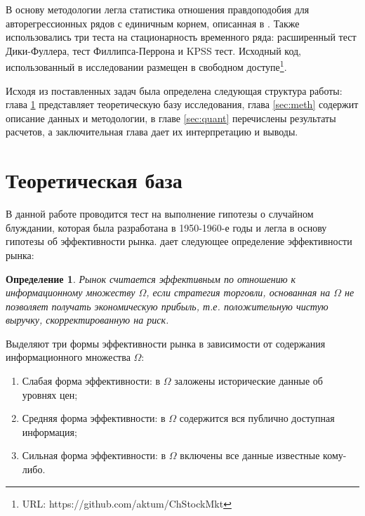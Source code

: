 \documentclass[a4paper,12pt]{article}
\newtheorem{definition}{Определение}
\begin{document}
В основу методологии легла статистика отношения правдоподобия для авторегрессионных рядов с единичным корнем, описанная в \cite{Dickey1981}. Также использовались три теста на стационарность временного ряда: расширенный тест Дики-Фуллера, тест Филлипса-Перрона и KPSS тест. Исходный код, использованный в исследовании размещен в свободном доступе{\footnote{URL: https://github.com/aktum/ChStockMkt}}.

Исходя из поставленных задач была определена следующая структура работы: глава \ref{sec:litrev} представляет теоретическую базу исследования, глава \ref{sec:meth} содержит описание данных и методологии, в главе \ref{sec:quant} перечислены результаты расчетов, а заключительная глава дает их интерпретацию и выводы.
\newpage
\section{Теоретическая база}\label{sec:litrev}

В данной работе проводится тест на выполнение гипотезы о случайном блуждании, которая была разработана в 1950-1960-е годы и легла в основу гипотезы об эффективности рынка. \cite{Jensen1978} дает следующее определение эффективности рынка:

\begin{definition}
  Рынок считается эффективным по отношению к информационному множеству $\Omega$, если стратегия торговли, основанная на $\Omega$ не позволяет получать экономическую прибыль, т.е. положительную чистую выручку, скорректированную на риск.
\end{definition}

Выделяют три формы эффективности рынка в зависимости от содержания информационного множества $\Omega$:
\begin{enumerate}
  \item Слабая форма эффективности: в $\Omega$ заложены исторические данные об уровнях цен;
  \item Средняя форма эффективности: в $\Omega$ содержится вся публично доступная информация;
  \item Сильная форма эффективности: в $\Omega$ включены все данные известные кому-либо.
\end{enumerate}
\end{document}
